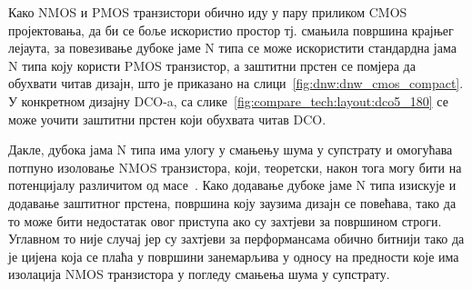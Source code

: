 \documentclass[master]{finthesis}
\def \DCO  {DCO} %
\begin{document}

Како NMOS и PMOS транзистори обично иду у пару приликом CMOS пројектовања, да би се боље искористио простор тј. смањила површина крајњег лејаута, за повезивање дубоке јаме N типа се може искористити стандардна јама N типа коју користи PMOS транзистор, а заштитни прстен се помјера да обухвати читав дизајн, што је приказано на слици~\ref{fig:dnw:dnw_cmos_compact}. У конкретном дизајну \DCO-a, са слике~\ref{fig:compare_tech:layout:dco5_180} се може уочити заштитни прстен који обухвата читав \DCO. \par

Дакле, дубока јама N типа има улогу у смањењу шума у супстрату и омогућава потпуно изоловање NMOS транзистора, који, теоретски, након тога могу бити на потенцијалу различитом од масе~\cite{DNW:aspencore}. Како додавање дубоке јаме N типа изискује и додавање заштитног прстена, површина коју заузима дизајн се повећава, тако да то може бити недостатак овог приступа ако су захтјеви за површином строги. Углавном то није случај јер су захтјеви за перформансама обично битнији тако да је цијена која се плаћа у површини занемарљива у односу на предности које има изолација NMOS транзистора у погледу смањења шума у супстрату.
\end{document}

